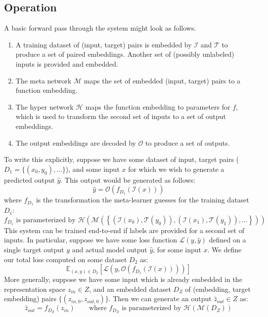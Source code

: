 \documentclass[11pt]{article}
\begin{document}
\subsection{Operation}
A basic forward pass through the system might look as follows.
\begin{enumerate}
\item A training dataset of (input, target) pairs is embedded by $\mathcal{I}$ and $\mathcal{T}$ to produce a set of paired embeddings. Another set of (possibly unlabeled) inputs is provided and embedded.
\item The meta network $\mathcal{M}$ maps the set of embedded (input, target) pairs to a function embedding.
\item The hyper network $\mathcal{H}$ maps the function embedding to parameters for $f$, which is used to transform the second set of inputs to a set of output embeddings.
\item The output embeddings are decoded by $\mathcal{O}$ to produce a set of outputs.
\end{enumerate}
To write this explicitly, suppose we have some dataset of input, target pairs ($D_1 = \{(x_0, y_0), ...\}$), and some input $x$ for which we wish to generate a predicted output $\hat{y}$. This output would be generated as follows: 
$$\hat{y} = \mathcal{O}\left(f_{D_1}\left(\mathcal{I} \left(x\right)\right) \right)$$
where $f_{D_1}$ is the transformation the meta-learner guesses for the training dataset $D_1$:
$$f_{D_1} \text{ is parameterized by } \mathcal{H}\left(\mathcal{M}\left( \left\{\left(\mathcal{I}\left(x_0\right), \mathcal{T}\left(y_0\right) \right), \left(\mathcal{I}\left(x_1\right), \mathcal{T}\left(y_1\right) \right), ... \right\}\right)\right)$$
This system can be trained end-to-end if labels are provided for a second set of inputs. In particular, suppose we have some loss function $\mathcal{L}(y, \hat{y})$ defined on a single target output $y$ and actual model output $\hat{y}$, for some input $x$. We define our total loss computed on some dataset $D_2$ as:
$$\mathbb{E}_{(x, y)\in {D}_2} \left[ \mathcal{L}\left(y, \mathcal{O}\left(f_{D_1}\left(\mathcal{I} \left(x\right)\right) \right)\right)\right]$$
More generally, suppose we have some input which is already embedded in the representation space $z_{in} \in Z$, and an embedded dataset $D_Z$ of (embedding, target embedding) pairs $\{(z_{in,0}, z_{out,0})\}$. Then we can generate an output $\hat{z}_{out} \in Z$ as:  
$$\hat{z}_{out} = f_{D_Z}(z_{in}) \qquad \text{where } f_{D_Z} \text{ is parameterized by } \mathcal{H}\left(\mathcal{M}\left(D_Z\right)\right)$$
\end{document}
